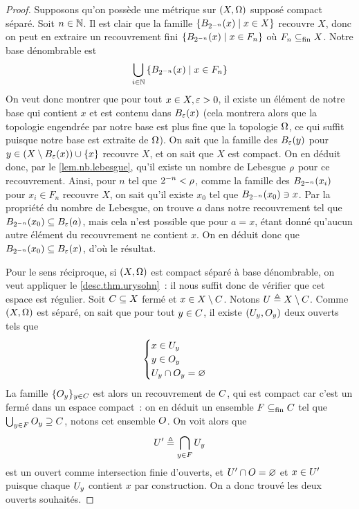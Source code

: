 \begin{proof}
  Supposons qu'on possède une métrique sur $(X,\topo)$ supposé compact séparé.
  Soit $n\in \bN$. Il est clair que la famille
  $\compr{\boule{x}{2^{-n}}}{x \in X}$ recouvre $X$, donc on peut en extraire un
  recouvrement fini $\compr{\boule{x}{2^{-n}}}{x \in F_n}$ où $F_n\subfin X$.
  Notre base dénombrable est
  \[\bigcup_{i\in \bN} \compr{\boule{x}{2^{-n}}}{x \in F_n}\]
  On veut donc montrer que pour tout $x\in X, \vareps > 0$, il existe un
  élément de notre base qui contient $x$ et est contenu dans
  $\boule{x}{\vareps}$ (cela montrera alors que la topologie engendrée par notre
  base est plus fine que la topologie $\topo$, ce qui suffit puisque notre base
  est extraite de $\topo$). On sait que la famille des $\boule{y}{\vareps}$ pour
  $y \in (X \setminus \boule{x}{\vareps})\cup \{x\}$ recouvre $X$, et on sait
  que $X$ est compact. On en déduit donc, par le \cref{lem.nb.lebesgue}, qu'il
  existe un nombre de Lebesgue $\LebNb$ pour ce recouvrement. Ainsi, pour $n$
  tel que $2^{-n} < \LebNb$, comme la famille des $\boule{x_i}{2^{-n}}$ pour
  $x_i \in F_n$ recouvre $X$, on sait qu'il existe $x_0$ tel que
  $\boule{x_0}{2^{-n}}\ni x$. Par la propriété du nombre de Lebesgue, on trouve
  $a$ dans notre recouvrement tel que
  $\boule{x_0}{2^{-n}}\subseteq \boule{a}{\vareps}$, mais cela n'est possible que
  pour $a = x$, étant donné qu'aucun autre élément du recouvrement ne contient
  $x$. On en déduit donc que $\boule{x_0}{2^{-n}}\subseteq \boule{x}{\vareps}$,
  d'où le résultat.

  Pour le sens réciproque, si $(X,\topo)$ est compact séparé à base dénombrable,
  on veut appliquer le \cref{desc.thm.urysohn}~: il nous suffit donc de vérifier
  que cet espace est régulier. Soit $\varCl\subseteq X$ fermé et
  $x\in X \setminus \varCl$. Notons $\varOp \defeq X \setminus \varCl$. Comme
  $(X,\topo)$ est séparé, on sait que pour tout $y \in \varCl$, il existe
  $(\varOp_y,\varOpB_y)$ deux ouverts tels que
  \[\begin{cases}
  x \in \varOp_y\\
  y \in \varOpB_y\\
  \varOp_y \cap \varOpB_y = \vide
  \end{cases}\]
  La famille $\{\varOpB_y\}_{y \in C}$ est alors un recouvrement de $\varCl$, qui
  est compact car c'est un fermé dans un espace compact~: on en déduit un
  ensemble $F\subfin \varCl$ tel que $\bigcup_{y \in F}\varOpB_y\supseteq\varCl$,
  notons cet ensemble $\varOpB$. On voit alors que
  \[\varOp' \defeq \bigcap_{y\in F} \varOp_y\]
  est un ouvert comme intersection finie d'ouverts, et
  $\varOp'\cap \varOpB = \vide$ et $x \in \varOp'$ puisque chaque $\varOp_y$
  contient $x$ par construction. On a donc trouvé les deux ouverts souhaités.


\end{proof}
